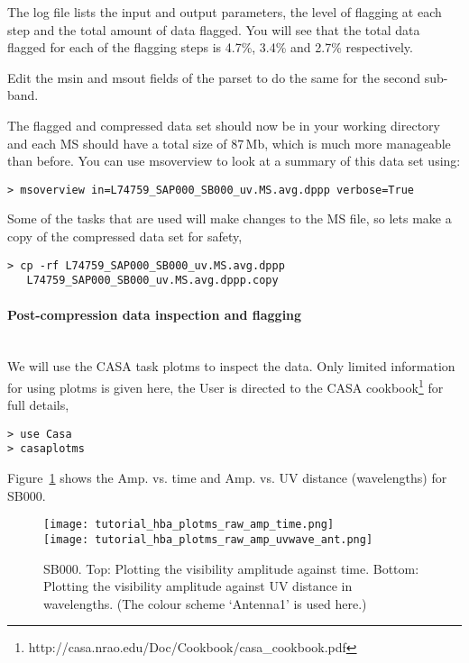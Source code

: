 The log file lists the input and output parameters, the level of flagging at each step and the total amount of data flagged. You will see that the total data flagged for each of the flagging steps is 4.7\%, 3.4\% and 2.7\% respectively.

Edit the msin and msout fields of the parset to do the same for the second sub-band.

The flagged and compressed data set should now be in your working directory and each MS should have a total size of 87\,Mb, which is much more manageable than before. You can use msoverview to look at a summary of this data set using:
\begin{verbatim}
> msoverview in=L74759_SAP000_SB000_uv.MS.avg.dppp verbose=True
\end{verbatim}

Some of the tasks that are used will make changes to the MS file, so lets make a
copy of the compressed data set for safety,
\begin{verbatim}
> cp -rf L74759_SAP000_SB000_uv.MS.avg.dppp 
   L74759_SAP000_SB000_uv.MS.avg.dppp.copy
\end{verbatim}

\paragraph{Post-compression data inspection and flagging}\mbox{}\\

We will use the CASA task plotms to inspect the data. Only limited information for using plotms is given here, the User is directed to the CASA cookbook\footnote{http://casa.nrao.edu/Doc/Cookbook/casa\_cookbook.pdf} for full details,
\begin{verbatim}
> use Casa
> casaplotms
\end{verbatim}
Figure~\ref{fig:plotms1} shows the Amp. vs. time and Amp. vs. UV distance
(wavelengths) for SB000.

\begin{figure}[Hb!]
\centering
\texttt{[image: tutorial\_hba\_plotms\_raw\_amp\_time.png]}\\
\texttt{[image: tutorial\_hba\_plotms\_raw\_amp\_uvwave\_ant.png]}
 \caption{SB000. Top: Plotting the visibility amplitude against time. 
Bottom: Plotting the visibility amplitude against UV distance in wavelengths.
(The colour scheme `Antenna1' is used here.)}
\label{fig:plotms1}
\end{figure}

